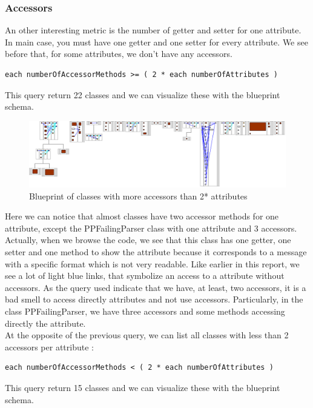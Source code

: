 \subsubsection{Accessors}
An other interesting metric is the number of getter and setter for one attribute.  In main case, you must have one getter and one setter for every attribute.  We see before that, for some attributes, we don't have any accessors. \\
\begin{lstlisting}
each numberOfAccessorMethods >= ( 2 * each numberOfAttributes ) 
\end{lstlisting}
This query return 22 classes and we can visualize these with the blueprint schema.\\
\begin{figure}[ht]
\centering
\label{more_access_blueprint}
\includegraphics[scale=0.35]{more_access_blueprint.png}
\caption{Blueprint of classes with more accessors than 2* attributes}
\end{figure}
Here we can notice that almost classes have two accessor methods for one attribute, except the PPFailingParser class with one attribute and 3 accessors.  Actually, when we browse the code, we see that this class has one getter, one setter and one method to show the attribute because it corresponds to a message with a specific format which is not very readable.  Like earlier in this report, we see a lot of light blue links, that symbolize an access to a attribute without accessors. As the query used indicate that we have, at least, two accessors, it is a bad smell to access directly attributes and not use accessors.  Particularly, in the class PPFailingParser, we have three accessors and some methods accessing directly the attribute.\\
At the opposite of the previous query, we can list all classes with less than 2 accessors per attribute : 
\begin{lstlisting}
each numberOfAccessorMethods < ( 2 * each numberOfAttributes ) 
\end{lstlisting}
This query return 15 classes and we can visualize these with the blueprint schema.\\

